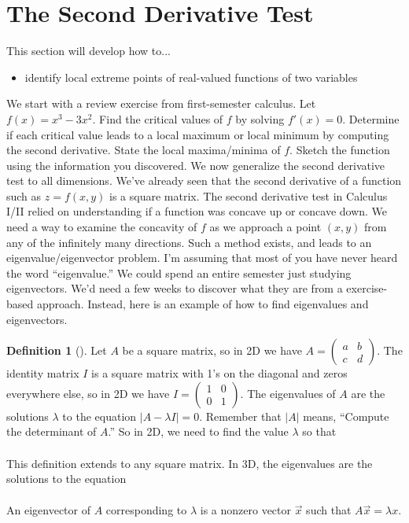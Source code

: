 \documentclass[10pt,]{book}
\theoremstyle{plain}
\theoremstyle{definition}
\newtheorem{definition}[theorem]{Definition}
\theoremstyle{definition}
\theoremstyle{definition}
\theoremstyle{definition}
\theoremstyle{definition}
\numberwithin{equation}{section}
\newcommand{\amp}{&}
\begin{document}
\section[{The Second Derivative Test}]{The Second Derivative Test}\label{section-35}
This section will develop how to... \leavevmode%
\begin{itemize}[label=\textbullet]
\item{}identify local extreme points of real-valued functions of two variables%
\end{itemize}
%
\par
We start with a review exercise from first-semester calculus.%
Let \(f(x) = x^3-3x^2\). Find the critical values of \(f\) by solving \(f'(x)=0\). Determine if each critical value leads to a local maximum or local minimum by computing the second derivative. State the local maxima/minima of \(f\). Sketch the function using the information you discovered.%
We now generalize the second derivative test to all dimensions. We've already seen that the second derivative of a function such as \(z=f(x,y)\) is a square matrix. The second derivative test in Calculus I/II relied on understanding if a function was concave up or concave down. We need a way to examine the concavity of \(f\) as we approach a point \((x,y)\) from any of the infinitely many directions. Such a method exists, and leads to an eigenvalue/eigenvector problem. I'm assuming that most of you have never heard the word ``eigenvalue.'' We could spend an entire semester just studying eigenvectors. We'd need a few weeks to discover what they are from a exercise-based approach. Instead, here is an example of how to find eigenvalues and eigenvectors.%
\begin{definition}[{}]\label{definition-39}
Let \(A\) be a square matrix, so in 2D we have \(A=\begin{pmatrix}a\amp b\\c\amp d
\end{pmatrix}\). The identity matrix \(I\) is a square matrix with 1's on the diagonal and zeros everywhere else, so in 2D we have \(I = \begin{pmatrix}1\amp 0\\0\amp 1
\end{pmatrix}\). The eigenvalues of \(A\) are the solutions \(\lambda\) to the equation \(|A-\lambda I|=0\). Remember that \(|A|\) means, ``Compute the determinant of \(A\).'' So in 2D, we need to find the value \(\lambda\) so that%
\begin{align*}

\end{align*}
%
\par
This definition extends to any square matrix. In 3D, the eigenvalues are the solutions to the equation%
\begin{align*}

\end{align*}
%
\par
An eigenvector of \(A\) corresponding to \(\lambda\) is a nonzero vector \(\vec x\) such that \(A\vec x=\lambda x\).%
\end{definition}
\end{document}
